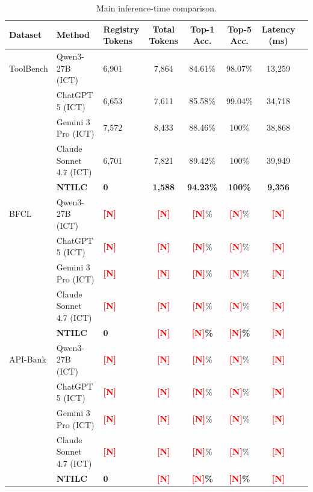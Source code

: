 \documentclass{article}
\newcommand{\placeholder}[1]{\textcolor{red}{\textbf{[#1]}}}
\begin{document}
\begin{table}[H]
\caption{Main inference-time comparison.}
\label{tab:model_comparison}
\centering
\small
\begin{tabular}{lllccccc}
\toprule
Dataset & Method & Registry Tokens & Total Tokens & Top-1 Acc. & Top-5 Acc. & Latency (ms) \\
\midrule
ToolBench & Qwen3-27B (ICT) & 6,901 & 7,864 & 84.61\% & 98.07\% & 13,259 \\
 & ChatGPT 5 (ICT) & 6,653 & 7,611 & 85.58\% & 99.04\% & 34,718 \\
 & Gemini 3 Pro (ICT) & 7,572 & 8,433 & 88.46\% & 100\% & 38,868 \\
 & Claude Sonnet 4.7 (ICT) & 6,701 & 7,821 & 89.42\% & 100\% & 39,949 \\
 & \textbf{NTILC} & \textbf{0}  & \textbf{1,588} & \textbf{94.23\%} & \textbf{100\%} & \textbf{9,356} \\
\midrule
BFCL & Qwen3-27B (ICT) & \placeholder{N} & \placeholder{N} & \placeholder{N}\% & \placeholder{N}\% & \placeholder{N} \\
 & ChatGPT 5 (ICT) & \placeholder{N} & \placeholder{N} & \placeholder{N}\% & \placeholder{N}\% & \placeholder{N} \\
 & Gemini 3 Pro (ICT) & \placeholder{N} & \placeholder{N} & \placeholder{N}\% & \placeholder{N}\% & \placeholder{N} \\
 & Claude Sonnet 4.7 (ICT) & \placeholder{N} & \placeholder{N} & \placeholder{N}\% & \placeholder{N}\% & \placeholder{N} \\
 & \textbf{NTILC} & \textbf{0} & \textbf{\placeholder{N}} & \textbf{\placeholder{N}\%} & \textbf{\placeholder{N}\%} & \textbf{\placeholder{N}} \\
\midrule
API-Bank & Qwen3-27B (ICT) & \placeholder{N} & \placeholder{N} & \placeholder{N}\% & \placeholder{N}\% & \placeholder{N} \\
 & ChatGPT 5 (ICT) & \placeholder{N} & \placeholder{N} & \placeholder{N}\% & \placeholder{N}\% & \placeholder{N} \\
 & Gemini 3 Pro (ICT) & \placeholder{N} & \placeholder{N} & \placeholder{N}\% & \placeholder{N}\% & \placeholder{N} \\
 & Claude Sonnet 4.7 (ICT) & \placeholder{N} & \placeholder{N} & \placeholder{N}\% & \placeholder{N}\% & \placeholder{N} \\
 & \textbf{NTILC} & \textbf{0} & \textbf{\placeholder{N}} & \textbf{\placeholder{N}\%} & \textbf{\placeholder{N}\%} & \textbf{\placeholder{N}} \\

\end{tabular}
\end{table}
\end{document}
